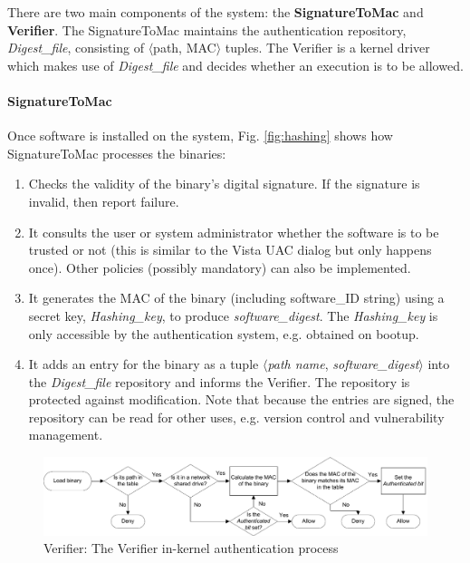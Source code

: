 There are two main components of the system: the {\bf SignatureToMac} and {\bf Verifier}.
The SignatureToMac maintains the authentication repository, {\it Digest\_file}, 
consisting of $\langle$path, MAC$\rangle$ tuples.
The Verifier is a kernel driver which makes use of
{\it Digest\_file} and
decides whether an execution is to be allowed.

\paragraph{SignatureToMac}

Once software is installed on the system,
Fig. \ref{fig:hashing} shows how SignatureToMac processes the binaries:
\begin{enumerate}
\item Checks the validity of the binary's digital signature.
If the signature is invalid, then report failure.
\item It consults the user or system administrator whether 
the software is to be trusted or not (this is similar to the Vista UAC 
dialog but only happens once).
Other policies (possibly mandatory) can also be implemented.
\item It generates the MAC of the binary 
(including software\_ID string) using a secret key, {\it Hashing\_key}, 
to produce {\it software\_digest}.
The {\it Hashing\_key} is only accessible
by the authentication system, e.g. obtained on bootup.
\item It adds an entry for the binary as a tuple $\langle${\it path name}, 
{\it software\_digest}$\rangle$ into the {\it Digest\_file} repository
and informs the Verifier.
The repository is protected against modification. Note that because the entries
are signed, the repository can be read for other uses, e.g.
version control and vulnerability management.
\end{enumerate}


\begin{figure}[tb]
\begin{center}
\includegraphics[scale=0.6]{binauth/verifier}
\caption{Verifier: The Verifier in-kernel authentication process}
\label{fig:verifier}
\end{center}
\end{figure}



